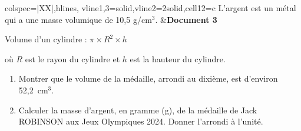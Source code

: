\documentclass[12pt,a4paper,french]{article}
\begin{document}
\begin{enumerate}
\begin{tblr}{colspec={|XX|},hlines, vline{1,3}={solid},vline{2}={2}{solid},cell{1}{2}={c}}
L'argent est un métal qui a une masse volumique de 10,5 g/cm$^3$. &\textbf{Document 3}

Volume d'un cylindre : $ \pi \times R^2 \times h$

où $R$ est le rayon du cylindre et $h$ est la hauteur du cylindre.\\
\end{tblr}

\medskip

	\begin{enumerate}
		\item Montrer que le volume de la médaille, arrondi au dixième, est d'environ 52,2~cm$^3$.
		\item Calculer la masse d'argent, en gramme (g), de la médaille de Jack ROBINSON aux Jeux Olympiques 2024. Donner l'arrondi à l'unité.
	\end{enumerate}
\end{enumerate}
\end{document}
